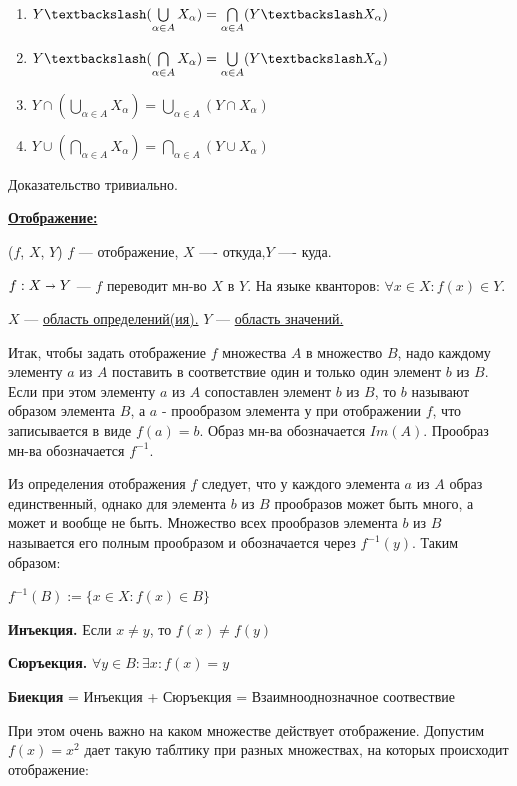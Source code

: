 \documentclass{article}
\newcommand{\deff}[1]{\underline{\textbf{#1}}}
\begin{document}
\begin{enumerate}
    \item  $ Y \textbackslash (\bigcup\limits_{\alpha \in A}X_\alpha) = \bigcap\limits_{\alpha \in A}(Y \textbackslash X_\alpha)$ 

    \item  $ Y \textbackslash (\bigcap\limits_{\alpha \in A}X_\alpha) = \bigcup\limits_{\alpha \in A}(Y \textbackslash X_\alpha)$ 

    \item $ Y \cap (\bigcup\limits_{\alpha \in A}X_\alpha) = \bigcup\limits_{\alpha \in A}(Y \cap X_\alpha)$ 
    
     \item $ Y \cup (\bigcap\limits_{\alpha \in A}X_\alpha) = \bigcap\limits_{\alpha \in A}(Y \cup X_\alpha)$ 
\end{enumerate}
Доказательство тривиально.

\deff{Отображение:}

($f$, $X$, $Y$) $f$ --- отображение, $X$ ---- откуда,$ Y$ ---- куда.

$f: X \shortrightarrow Y$ --- $f$ переводит мн-во  $X$ в $Y$. На языке кванторов: $\forall x \in X: f(x) \in Y$.

$X$ --- \uline{область определений(ия).} $Y$ --- \uline{область значений.}

Итак, чтобы задать отображение $f$ множества $A$ в множество $B$, надо каждому элементу $a$ из $A$ поставить в соответствие один и только один элемент $b$ из $B$. Если при этом элементу $a$ из $A$ сопоставлен элемент $b$ из $B$, то $b$ называют образом элемента $B$, а $a$ - прообразом элемента $у$ при отображении $f$, что записывается в виде $f(a)=b$. Образ мн-ва обозначается $Im(A)$. Прообраз мн-ва  обозначается $f^{-1}$.

Из определения отображения $f$ следует, что у каждого элемента $a$ из $A$ образ единственный, однако для элемента $b$ из $B$ прообразов может быть много, а может и вообще не быть. Множество всех прообразов элемента $b$ из $B$ называется его полным прообразом и обозначается через $f^{-1}(y)$. Таким образом:


$f^{-1}(B):= \{x \in X: f(x) \in B\}$

\textbf{Инъекция.} Если $x \neq y$, то $f(x) \neq f(y)$

\textbf{Сюръекция.} $\forall y \in B: \exists x: f(x)=y$

\textbf{Биекция} = Инъекция + Сюръекция = Взаимнооднозначное соотвествие

При этом очень важно на каком множестве действует отображение. Допустим $f(x)=x^2$ дает такую таблтику при разных множествах, на которых происходит отображение:
\end{document}
